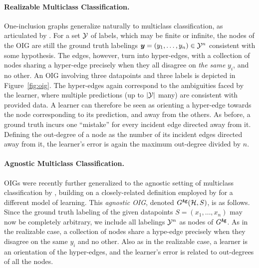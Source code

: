 \paragraph{Realizable Multiclass Classification.} One-inclusion graphs generalize naturally to multiclass classification, as articulated by \cite{rubinstein_shifting_2009}. For a set $\mathcal{Y}$ of labels, which may be finite or infinite, the nodes of the OIG are still the  ground truth labelings $\boldsymbol{ y }=(y_1,\ldots,y_n) \in \mathcal{Y}^n$ consistent with some hypothesis. The edges, however, turn into hyper-edges, with a collection of nodes sharing a hyper-edge precisely when they all disagree on \emph{the same} $y_i$, and no other.  An OIG involving  three datapoints and three labels  is depicted in Figure~\ref{fig:oig}. %
The hyper-edges again correspond to the ambiguities faced by the learner, where multiple predictions (up to $|\mathcal{Y}|$ many) are consistent with provided data. A learner can therefore be seen as orienting a hyper-edge towards the node corresponding to its prediction, and away from the others. As before, a ground truth incurs one ``mistake'' for every incident edge directed away from it.  Defining the out-degree of a node as the number of its incident edges directed away from it, the learner's error is again the maximum out-degree divided by $n$.




\paragraph{Agnostic Multiclass Classification.} 
OIGs were recently further generalized to the agnostic setting of multiclass classification by  \citet{asilis_regularization_2024}, building on a closely-related definition employed by \citet{long_complexity_1999} for a different model of learning. This \emph{agnostic OIG}, denoted $G^{\mathtt{Ag}}(\mathcal{H},S)$, is as follows.  Since the ground truth labeling of the given datapoints $S=(x_1,\ldots,x_n)$ may now be completely arbitrary, we include all labelings $\mathcal{Y}^n$ as nodes of $G^{\mathtt{Ag}}$.  As in the realizable case, a collection of nodes share a hype-edge precisely when they disagree on the same $y_i$ and no other.   Also as in the realizable case, a learner is an orientation of the hyper-edges, and the learner's error is related to out-degrees of all the nodes.

